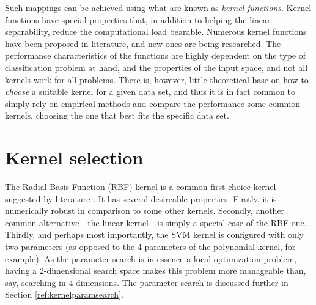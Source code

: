 \documentclass{netsec2012}
\begin{document}
Such mappings can be achieved using what are known as \emph{kernel functions}.  Kernel functions
have special properties that, in addition to helping the linear separability, reduce the
computational load bearable.  Numerous kernel functions have been proposed in literature, and new
ones are being researched.  The performance characteristics of the functions are highly dependent on
the type of classification problem at hand, and the properties of the input space, and not all
kernels work for all problems.  There is, however, little theoretical base on how to \emph{choose} a
suitable kernel for a given data set, and thus it is in fact common to simply rely on empirical
methods and compare the performance some common kernels, choosing the one that best fits the
specific data set. \cite{svm_chemistry}

%
%
%

\section{Kernel selection}

The Radial Basis Function (RBF) kernel is a common first-choice kernel suggested by literature
\cite{libsvm_guide,svm_chemistry}. It has several desireable properties.  Firstly, it is numerically
robust in comparison to some other kernels.  Secondly, another common alternative - the linear
kernel - is simply a special case of the RBF one.  Thirdly, and perhaps most importantly, the SVM
kernel is configured with only two parameters (as opposed to the 4 parameters of the polynomial
kernel, for example).  As the parameter search is in essence a local optimization problem, having a
2-dimensional search space makes this problem more manageable than, say, searching in 4 dimensions.
The parameter search is discussed further in Section \ref{ref:kernelparamsearch}. \cite{libsvm_guide}
\end{document}
